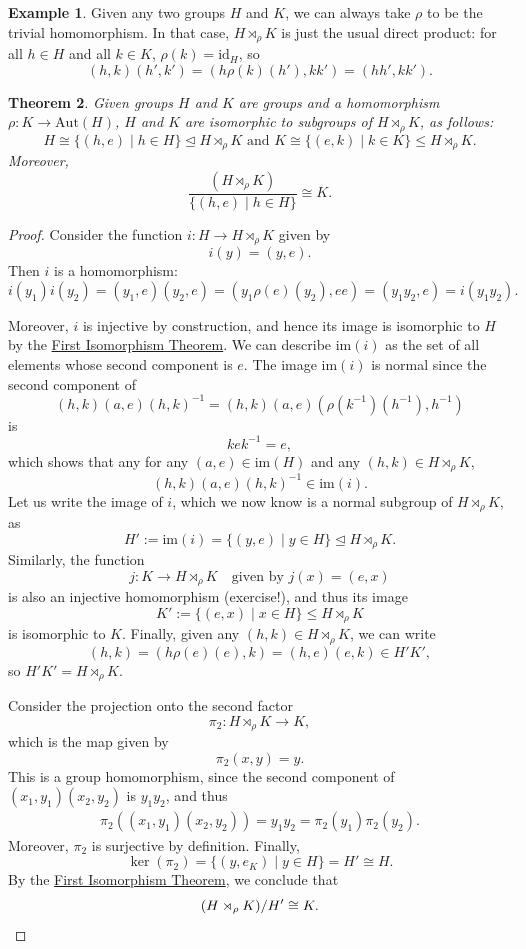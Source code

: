 \documentclass[12pt]{report}
\newtheorem{theorem}{Theorem}[chapter]
\numberwithin{equation}{section}
\numberwithin{theorem}{chapter}
\theoremstyle{definition}
\newtheorem{example}[theorem]{Example}
\newtheorem*{basic properties}{Basic Properties}
\newtheorem*{Important Remark}{Important Remark}
\def\sdp{\rtimes}
\renewcommand{\ker}{\operatorname{ker}}
\begin{document}
\begin{example}\label{semidirect product is direct if trivial}
Given any two groups $H$ and $K$, we can always take $\rho$ to be the trivial homomorphism. In that case, $H \sdp_\rho K$ is just the usual direct product: for all $h \in H$ and all $k \in K$, $\rho(k) = \mathrm{id}_H$, so
$$(h,k)(h',k') = (h\rho(k)(h'),kk') = (hh',kk').$$
\end{example}



\begin{theorem}\label{semidirect product}
Given groups $H$ and $K$ are groups and a homomorphism $\rho\!: K \to \mathrm{Aut}(H)$, $H$ and $K$ are isomorphic to subgroups of $H \sdp_\rho K$, as follows:
$$H \cong \{(h,e)\mid h\in H\} \trianglelefteq H \sdp_\rho K \text{ and } K \cong \{(e,k)\mid k\in K\} \leq H \sdp_\rho K.$$
Moreover,
$$\frac{(H \sdp_\rho K )}{\{(h,e)\mid h\in H\}} \cong K.$$
\end{theorem}

\begin{proof}
Consider the function $i\!: H \to H \sdp_\rho K$ given by 
$$i(y) = (y, e).$$
Then $i$ is a homomorphism:
$$i(y_1) i(y_2) = (y_1,e)(y_2,e) = (y_1\rho(e)(y_2) , ee) = (y_1 y_2, e) = i(y_1y_2).$$

Moreover, $i$ is injective by construction, and hence its image is isomorphic to $H$ by the \hyperref[first iso thm]{First Isomorphism Theorem}. We can describe $\mathrm{im}(i)$ as the set of all elements whose second component is $e$.
The image $\mathrm{im}(i)$ is normal since the second component of
$$(h,k) (a, e) (h,k)^{-1} = (h,k) (a, e) (\rho(k^{-1})(h^{-1}), h^{-1})$$
is
$$kek^{-1} = e,$$
which shows that any for any $(a,e) \in \mathrm{im}(H)$ and any $(h,k) \in H \sdp_\rho K$,
$$(h,k) (a, e) (h,k)^{-1} \in \mathrm{im}(i).$$
Let us write the image of $i$, which we now know is a normal subgroup of $H \sdp_\rho K$, as
$$H' := \mathrm{im}(i) = \{(y,e) \mid y \in H\} \trianglelefteq  H \sdp_\rho K.$$
Similarly, the function
$$j\!: K \to H \sdp_\rho K \quad \text{given by } j(x) = (e,x)$$
is also an injective homomorphism (exercise!), and thus its image 
$$K' := \{(e,x) \mid x \in H \} \leq H \sdp_\rho K$$
is isomorphic to $K$. 
Finally, given any $(h,k) \in H \sdp_{\rho} K$, we can write
$$ (h,k) = (h\rho(e)(e),k) = (h,e)(e,k) \in H'K',$$
so $H'K'= H \sdp_\rho K$.

Consider the projection onto the second factor 
$$\pi_2\!:H \sdp_\rho K \to  K,$$
which is the map given by 
$$\pi_2(x,y)=y.$$
This is a group homomorphism, since the second component of $(x_1,y_1)(x_2,y_2)$ is $y_1y_2$, and thus
$$\begin{aligned}
\pi_2(	(x_1,y_1)(x_2,y_2) ) = y_1y_2 = \pi_2(y_1) \pi_2(y_2).
\end{aligned}$$
Moreover, $\pi_2$ is surjective by definition. Finally, 
$$\ker(\pi_2)=\{(y,e_K)\mid y\in H\}=H'\cong H.$$
By the \hyperref[first iso thm]{First Isomorphism Theorem}, we conclude that 
$$(H \sdp_\rho K )/ H' \cong K.\qedhere$$
\end{proof}
\end{document}
